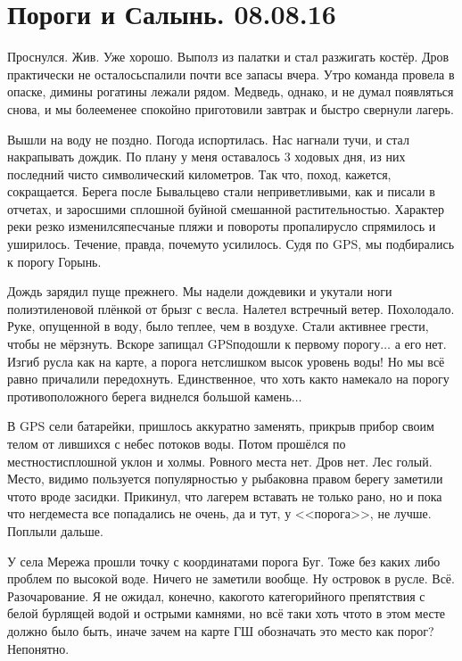 \chapter{Пороги и Салынь. 08.08.16} 

Проснулся. Жив. Уже хорошо. Выполз из палатки и стал разжигать костёр. Дров практически не осталось\mdash спалили почти все запасы вчера. Утро команда провела в опаске, димины рогатины лежали рядом. Медведь, однако, и не думал появляться снова, и мы более\sdash менее спокойно приготовили завтрак и быстро свернули лагерь. 

Вышли на воду не поздно. Погода испортилась. Нас нагнали тучи, и стал накрапывать дождик. По плану у меня оставалось 3 ходовых дня, из них последний чисто символический километров. Так что, поход, кажется, сокращается. Берега после Бывальцево стали неприветливыми, как и писали в отчетах, и заросшими сплошной буйной смешанной растительностью. Характер реки резко изменился\mdash песчаные пляжи и повороты пропали\mdash русло спрямилось и уширилось. Течение, правда, почему\sdash то усилилось. Судя по GPS, мы подбирались к порогу Горынь.

Дождь зарядил пуще прежнего. Мы надели дождевики и укутали ноги полиэтиленовой плёнкой от брызг с весла. Налетел встречный ветер. Похолодало. Руке, опущенной в воду, было теплее, чем в воздухе. Стали активнее грести, чтобы не мёрзнуть. Вскоре запищал GPS\mdash подошли к первому порогу$\ldots$ а его нет. Изгиб русла как на карте, а порога нет\mdash слишком высок уровень воды! Но мы всё равно причалили передохнуть. Единственное, что хоть как\sdash то намекало на порог\mdash у противоположного берега виднелся большой камень$\ldots$ 

В GPS сели батарейки, пришлось аккуратно заменять, прикрыв прибор своим телом от лившихся с небес потоков воды. Потом прошёлся по местности\mdash сплошной уклон и холмы. Ровного места нет. Дров нет. Лес голый. Место, видимо пользуется популярностью у рыбаков\mdash на правом берегу заметили что\sdash то вроде засидки. Прикинул, что лагерем вставать не только рано, но и пока что негде\mdash места все попадались не очень, да и тут, у <<порога>>, не лучше. Поплыли дальше. 

У села Мережа прошли точку с координатами порога Буг. Тоже без каких либо проблем по высокой воде. Ничего не заметили вообще. Ну островок в русле. Всё. Разочарование. Я не ожидал, конечно, какого\sdash то категорийного препятствия с белой бурлящей водой и острыми камнями, но всё таки хоть что\sdash то в этом месте должно было быть, иначе зачем на карте ГШ обозначать это место как порог? Непонятно. 

